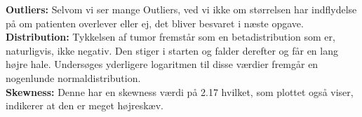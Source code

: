 \begin{enumerate}
\begin{figure}[h]
    \centering
{}\hfill
  \hfill
\end{figure}
\textbf{Outliers:} Selvom vi ser mange Outliers, ved vi ikke om størrelsen har indflydelse på om patienten overlever eller ej, det bliver besvaret i næste opgave.\\
\textbf{Distribution: } Tykkelsen af tumor fremstår som en betadistribution som er, naturligvis, ikke negativ. Den stiger i starten og falder derefter og får en lang højre hale. Undersøges yderligere logaritmen til disse værdier fremgår en nogenlunde normaldistribution.\\
\textbf{Skewness:} Denne har en skewness værdi på 2.17 hvilket, som plottet også viser, indikerer at den er meget højreskæv.


\end{enumerate}
